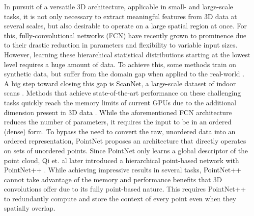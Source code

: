 \documentclass[runningheads]{llncs}
\begin{document}
In pursuit of a versatile 3D architecture, applicable in small- and large-scale tasks, it is not only necessary to extract meaningful features from 3D data at several scales, but also desirable to operate on a large spatial region at once. For this, fully-convolutional networks (FCN) \cite{Shelhamer2016} have recently grown to prominence due to their drastic reduction in parameters and flexibility to variable input sizes. However, learning these hierarchical statistical distributions starting at the lowest level requires a huge amount of data. To achieve this, some methods train on synthetic data, but suffer from the domain gap when applied to the real-world \cite{Song2016}. A big step toward closing this gap is ScanNet, a large-scale dataset of indoor scans \cite{Dai2017}. Methods that achieve state-of-the-art performance on these challenging tasks quickly reach the memory limits of current GPUs due to the additional dimension present in 3D data \cite{Klokov2017,Riegler2017}. While the aforementioned FCN architecture reduces the number of parameters, it requires the input to be in an ordered (dense) form. To bypass the need to convert the raw, unordered data into an ordered representation, PointNet \cite{Qi2017} proposes an architecture that directly operates on sets of unordered points. Since PointNet only learns a global descriptor of the point cloud, Qi et. al later introduced a hierarchical point-based network with PointNet++ \cite{Qi2017_2}. While achieving impressive results in several tasks, PointNet++ cannot take advantage of the memory and performance benefits that 3D convolutions offer due to its fully point-based nature. This requires PointNet++ to redundantly compute and store the context of every point even when they spatially overlap.\\
\end{document}
